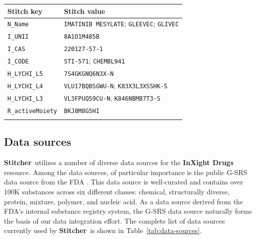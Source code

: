 \documentclass{bioinfo}
\newcommand\st{\textbf{Stitcher}}
\newcommand\ix{\textbf{InXight Drugs}}
\begin{document}
\begin{table}[thb]
{\begin{tabular}{@{}ll@{}}\toprule Stitch key &
Stitch value\\\midrule
\texttt{N\_Name} & \texttt{IMATINIB MESYLATE}; \texttt{GLEEVEC}; \texttt{GLIVEC}\\
\texttt{I\_UNII} & \texttt{8A1O1M485B}\\
\texttt{I\_CAS} & \texttt{220127-57-1}\\
\texttt{I\_CODE} & \texttt{STI-571}; \texttt{CHEMBL941}\\
\texttt{H\_LYCHI\_L5} & \texttt{7S4GKGNQ6N3X-N}\\
\texttt{H\_LYCHI\_L4} & \texttt{VLU17BQBSGWU-N}; \texttt{K83X3L3XSSHK-S}\\
\texttt{H\_LYCHI\_L3} & \texttt{VL3FPUQ59CU-N}; \texttt{K846NBMB7T3-S}\\
\texttt{R\_activeMoiety} & \texttt{BKJ8M8G5HI}\\\botrule
\end{tabular}}{}
\end{table}

\subsection{Data sources}
\st\ utilizes a number of diverse data sources for the \ix{} resource. Among the data sources, of particular importance is the public G-SRS data source from the FDA \citep{GSRSData}. This data source is well-curated and contains over 100K substances across six different classes: chemical, structurally diverse, protein, mixture, polymer, and nucleic acid. As a data source derived from the FDA's internal substance registry system, the G-SRS data source naturally forms the basis of our data integration effort. The complete list of data sources currently used by \st\ is shown in Table~\ref{tab:data-sources}.
\end{document}
